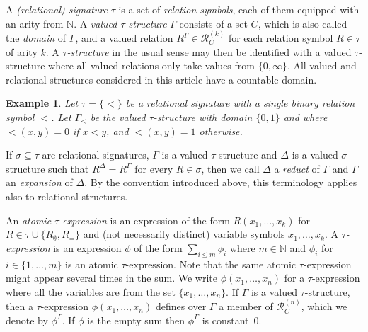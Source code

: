 \documentclass[nonacm]{acmart}
\newtheorem{expl}[theorem]{Example}
\begin{document}
A \emph{(relational) signature} $\tau$ is a set of \emph{relation symbols}, each of them equipped with an arity from ${\mathbb N}$. A \emph{valued $\tau$-structure} $\Gamma$ consists of a set $C$, which is also called the \emph{domain} of $\Gamma$, and a valued relation $R^{\Gamma} \in {\mathscr R}_C^{(k)}$ for each relation symbol $R \in \tau$ of arity $k$. A \emph{$\tau$-structure} in the usual sense may then be identified with a valued $\tau$-structure where all valued relations only take values from $\{0,\infty\}$.
All valued and relational structures considered in this article have a countable domain.

\begin{expl}\label{expl:vs-mc} 
Let $\tau = \{<\}$ be a relational signature with a single binary relation symbol $<$. 
Let $\Gamma_{<}$ be the valued $\tau$-structure with domain $\{0,1\}$ and where
${<}(x,y) = 0$ if $x < y$, and
${<}(x,y) = 1$ otherwise. 
\end{expl}

If $\sigma \subseteq \tau$ are relational signatures, $\Gamma$ is a valued $\tau$-structure and $\Delta$ is a valued $\sigma$-structure such that $R^{\Delta} = R^{\Gamma}$ for every $R \in \sigma$, then we call $\Delta$ a \emph{reduct} of $\Gamma$ and $\Gamma$ an \emph{expansion} of $\Delta$. By the convention introduced above, this terminology applies also to relational structures.

An \emph{atomic $\tau$-expression} is an expression
of the form $R(x_1,\dots,x_k)$ for $R \in \tau \cup \{R_\emptyset, R_= \}$ and (not necessarily distinct) variable symbols $x_1,\dots,x_k$. 
A \emph{$\tau$-expression} is an expression $\phi$ 
of the form 
$\sum_{i \leq m} \phi_i$
where $m \in {\mathbb N}$ 
and $\phi_i$ for $i \in \{1,\dots,m\}$ is 
an atomic $\tau$-expression.
Note that the same atomic $\tau$-expression might appear several times in the sum. 
We write $\phi(x_1,\dots,x_n)$ for a $\tau$-expression where all the variables  
are from the set $\{x_1,\dots,x_n\}$. 
If $\Gamma$ is a valued $\tau$-structure, then a $\tau$-expression $\phi(x_1,\dots,x_n)$ defines over $\Gamma$ a member of ${\mathscr R}_C^{(n)}$, which we denote by $\phi^{\Gamma}$. If $\phi$ is the empty sum then $\phi^{\Gamma}$ is constant~$0$. 
\end{document}
